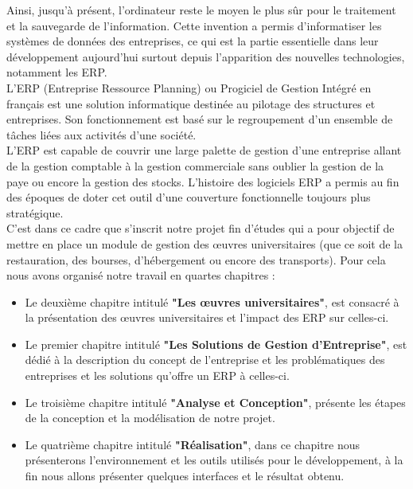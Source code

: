 \documentclass[11pt,a4paper,onecolumn,openright,oneside]{report}
\begin{document}
		Ainsi, jusqu'à présent, l'ordinateur reste le moyen le plus sûr pour le traitement et la sauvegarde de l'information. Cette invention a permis d'informatiser les systèmes de données des entreprises, ce qui est la partie essentielle dans leur développement aujourd'hui surtout depuis l'apparition des nouvelles technologies, notamment les \acs{ERP}.\\
		
		L'\acs{ERP} (Entreprise Ressource Planning) ou Progiciel de Gestion Intégré en français est une solution informatique destinée au pilotage des structures et entreprises. Son fonctionnement est basé sur le regroupement d'un ensemble de tâches liées aux activités d'une société.\\
		
		L'\acs{ERP} est capable de couvrir une large palette de gestion d'une entreprise allant de la gestion comptable à la gestion commerciale sans oublier la gestion de la paye ou encore la gestion des stocks. L'histoire des logiciels \acs{ERP} a permis au fin des époques de doter cet outil d'une couverture fonctionnelle toujours plus stratégique.\\
		
		C'est dans ce cadre que s'inscrit notre projet fin d'études qui a pour objectif de mettre en place un module de gestion des œuvres universitaires (que ce soit de la restauration, des bourses, d'hébergement ou encore des transports). Pour cela nous avons organisé notre travail en quartes chapitres :\\
		
		\begin{itemize}
			\item Le deuxième chapitre intitulé \textbf{"Les œuvres universitaires"}, est consacré à la présentation des œuvres universitaires et l'impact des \acs{ERP} sur celles-ci.
			\item Le premier chapitre intitulé \textbf{"Les Solutions de Gestion d'Entreprise"}, est dédié à la description du concept de l'entreprise et les problématiques des entreprises et les solutions qu'offre un \acs{ERP} à celles-ci.
			\item Le troisième chapitre intitulé \textbf{"Analyse et Conception"}, présente les étapes de la conception et la modélisation de notre projet.
			\item Le quatrième chapitre intitulé \textbf{"Réalisation"}, dans ce chapitre nous présenterons l'environnement et les outils utilisés pour le développement, à la fin nous allons présenter quelques interfaces et le résultat obtenu.
		\end{itemize}
	
\end{document}
